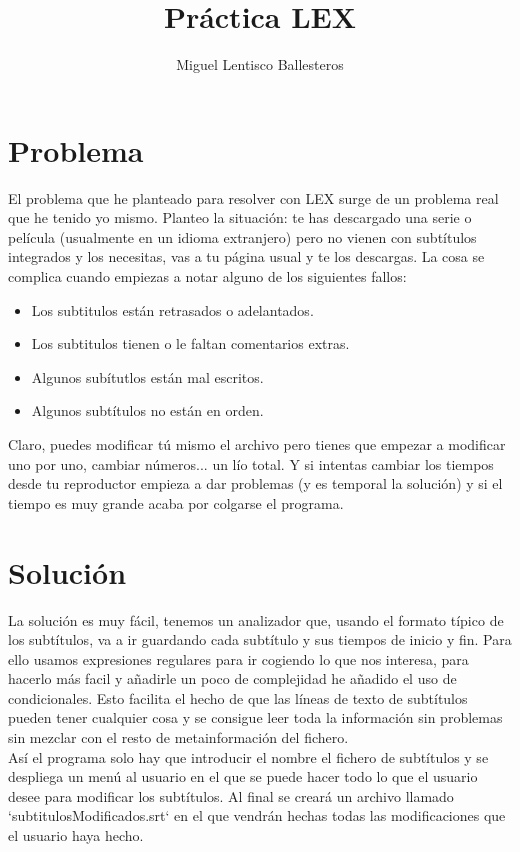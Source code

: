 \documentclass[11pt]{article}
\title{\textbf{Práctica LEX}}
\author{Miguel Lentisco Ballesteros}
\begin{document}
\maketitle

\section{Problema}

El problema que he planteado para resolver con LEX surge de un problema real que he tenido yo mismo. Planteo la situación: te has descargado una serie o película (usualmente en un idioma extranjero) pero no vienen con subtítulos integrados y los necesitas, vas a tu página usual y te los descargas. La cosa se complica cuando empiezas a notar alguno de los siguientes fallos:
\begin{itemize}
	\item Los subtitulos están retrasados o adelantados.
	\item Los subtitulos tienen o le faltan comentarios extras.
	\item Algunos subítutlos están mal escritos.
	\item Algunos subtítulos no están en orden.
\end{itemize}

Claro, puedes modificar tú mismo el archivo pero tienes que empezar a modificar uno por uno, cambiar números... un lío total. Y si intentas cambiar los tiempos desde tu reproductor empieza a dar problemas (y es temporal la solución) y si el tiempo es muy grande acaba por colgarse el programa.

\section{Solución}
La solución es muy fácil, tenemos un analizador que, usando el formato típico de los subtítulos, va a ir guardando cada subtítulo y sus tiempos de inicio y fin. Para ello usamos expresiones regulares para ir cogiendo lo que nos interesa, para hacerlo más facil y añadirle un poco de complejidad he añadido el uso de condicionales. Esto facilita el hecho de que las líneas de texto de subtítulos pueden tener cualquier cosa y se consigue leer toda la información sin problemas sin mezclar con el resto de metainformación del fichero. \\

Así el programa solo hay que introducir el nombre el fichero de subtítulos y se despliega un menú al usuario en el que se puede hacer todo lo que el usuario desee para modificar los subtítulos. Al final se creará un archivo llamado `subtitulosModificados.srt` en el que vendrán hechas todas las modificaciones que el usuario haya hecho.
\end{document}
